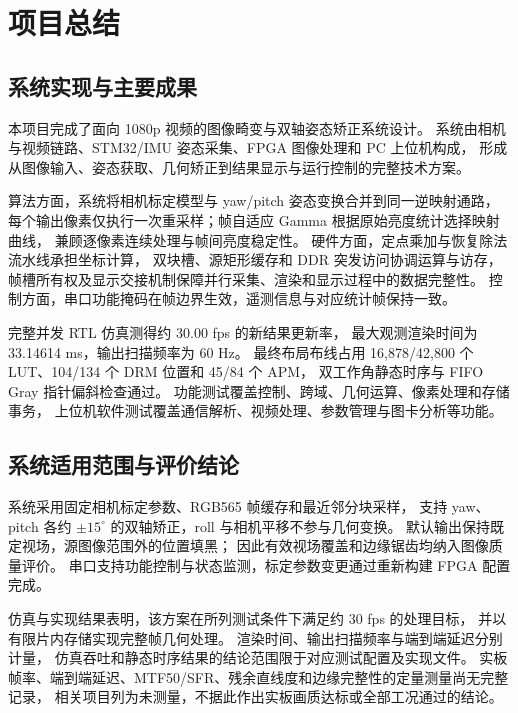 \chapter{项目总结}
\section{系统实现与主要成果}
本项目完成了面向 1080p 视频的图像畸变与双轴姿态矫正系统设计。
系统由相机与视频链路、STM32/IMU 姿态采集、FPGA 图像处理和 PC 上位机构成，
形成从图像输入、姿态获取、几何矫正到结果显示与运行控制的完整技术方案。

算法方面，系统将相机标定模型与 yaw/pitch 姿态变换合并到同一逆映射通路，
每个输出像素仅执行一次重采样；帧自适应 Gamma 根据原始亮度统计选择映射曲线，
兼顾逐像素连续处理与帧间亮度稳定性。
硬件方面，定点乘加与恢复除法流水线承担坐标计算，
双块槽、源矩形缓存和 DDR 突发访问协调运算与访存，
帧槽所有权及显示交接机制保障并行采集、渲染和显示过程中的数据完整性。
控制方面，串口功能掩码在帧边界生效，遥测信息与对应统计帧保持一致。

完整并发 RTL 仿真测得约 30.00 fps 的新结果更新率，
最大观测渲染时间为 33.14614 ms，输出扫描频率为 60 Hz。
最终布局布线占用 16,878/42,800 个 LUT、104/134 个 DRM 位置和 45/84 个 APM，
双工作角静态时序与 FIFO Gray 指针偏斜检查通过。
功能测试覆盖控制、跨域、几何运算、像素处理和存储事务，
上位机软件测试覆盖通信解析、视频处理、参数管理与图卡分析等功能。

\section{系统适用范围与评价结论}
系统采用固定相机标定参数、RGB565 帧缓存和最近邻分块采样，
支持 yaw、pitch 各约 $\pm15^\circ$ 的双轴矫正，roll 与相机平移不参与几何变换。
默认输出保持既定视场，源图像范围外的位置填黑；
因此有效视场覆盖和边缘锯齿均纳入图像质量评价。
串口支持功能控制与状态监测，标定参数变更通过重新构建 FPGA 配置完成。

仿真与实现结果表明，该方案在所列测试条件下满足约 30 fps 的处理目标，
并以有限片内存储实现完整帧几何处理。
渲染时间、输出扫描频率与端到端延迟分别计量，
仿真吞吐和静态时序结果的结论范围限于对应测试配置及实现文件。
实板帧率、端到端延迟、MTF50/SFR、残余直线度和边缘完整性的定量测量尚无完整记录，
相关项目列为未测量，不据此作出实板画质达标或全部工况通过的结论。
